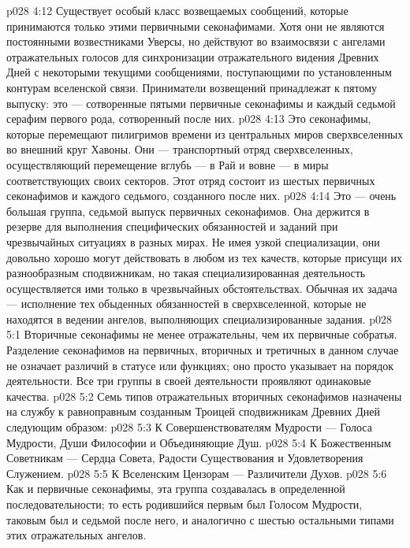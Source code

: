 \vs p028 4:12 \pc {}\bibnobreakspace {} Существует особый класс возвещаемых сообщений, которые принимаются только этими первичными секонафимами. Хотя они не являются постоянными возвестниками Уверсы, но действуют во взаимосвязи с ангелами отражательных голосов для синхронизации отражательного видения Древних Дней с некоторыми текущими сообщениями, поступающими по установленным контурам вселенской связи. Приниматели возвещений принадлежат к пятому выпуску: это --- сотворенные пятыми первичные секонафимы и каждый седьмой серафим первого рода, сотворенный после них.
\vs p028 4:13 \pc {}\bibnobreakspace {} Это секонафимы, которые перемещают пилигримов времени из центральных миров сверхвселенных во внешний круг Хавоны. Они --- транспортный отряд сверхвселенных, осуществляющий перемещение вглубь --- в Рай и вовне --- в миры соответствующих своих секторов. Этот отряд состоит из шестых первичных секонафимов и каждого седьмого, созданного после них.
\vs p028 4:14 \pc {}\bibnobreakspace {} Это --- очень большая группа, седьмой выпуск первичных секонафимов. Она держится в резерве для выполнения специфических обязанностей и заданий при чрезвычайных ситуациях в разных мирах. Не имея узкой специализации, они довольно хорошо могут действовать в любом из тех качеств, которые присущи их разнообразным сподвижникам, но такая специализированная деятельность осуществляется ими только в чрезвычайных обстоятельствах. Обычная их задача --- исполнение тех обыденных обязанностей в сверхвселенной, которые не находятся в ведении ангелов, выполняющих специализированные задания.
\vs p028 5:1 Вторичные секонафимы не менее отражательны, чем их первичные собратья. Разделение секонафимов на первичных, вторичных и третичных в данном случае не означает различий в статусе или функциях; оно просто указывает на порядок деятельности. Все три группы в своей деятельности проявляют одинаковые качества.
\vs p028 5:2 \pc Семь типов отражательных вторичных секонафимов назначены на службу к равноправным созданным Троицей сподвижникам Древних Дней следующим образом:
\vs p028 5:3 К Совершенствователям Мудрости --- Голоса Мудрости, Души Философии и Объединяющие Душ.
\vs p028 5:4 К Божественным Советникам --- Сердца Совета, Радости Существования и Удовлетворения Служением.
\vs p028 5:5 К Вселенским Цензорам --- Различители Духов.
\vs p028 5:6 \pc Как и первичные секонафимы, эта группа создавалась в определенной последовательности; то есть родившийся первым был Голосом Мудрости, таковым был и седьмой после него, и аналогично с шестью остальными типами этих отражательных ангелов.
